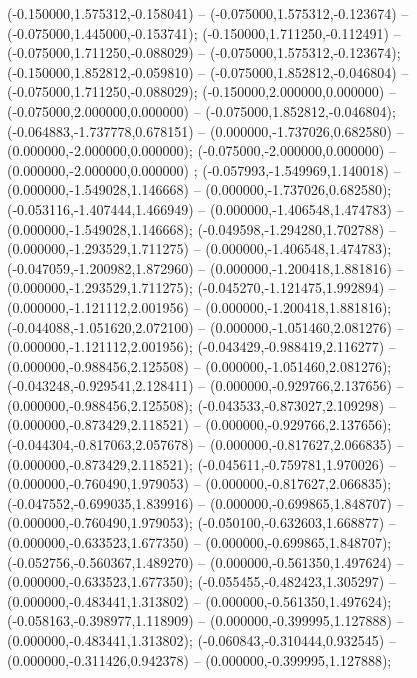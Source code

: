  (-0.150000,1.575312,-0.158041) -- (-0.075000,1.575312,-0.123674) -- (-0.075000,1.445000,-0.153741);
 (-0.150000,1.711250,-0.112491) -- (-0.075000,1.711250,-0.088029) -- (-0.075000,1.575312,-0.123674);
 (-0.150000,1.852812,-0.059810) -- (-0.075000,1.852812,-0.046804) -- (-0.075000,1.711250,-0.088029);
 (-0.150000,2.000000,0.000000) -- (-0.075000,2.000000,0.000000) -- (-0.075000,1.852812,-0.046804);
 (-0.064883,-1.737778,0.678151) -- (0.000000,-1.737026,0.682580) -- (0.000000,-2.000000,0.000000);
 (-0.075000,-2.000000,0.000000) -- (0.000000,-2.000000,0.000000) ;
 (-0.057993,-1.549969,1.140018) -- (0.000000,-1.549028,1.146668) -- (0.000000,-1.737026,0.682580);
 (-0.053116,-1.407444,1.466949) -- (0.000000,-1.406548,1.474783) -- (0.000000,-1.549028,1.146668);
 (-0.049598,-1.294280,1.702788) -- (0.000000,-1.293529,1.711275) -- (0.000000,-1.406548,1.474783);
 (-0.047059,-1.200982,1.872960) -- (0.000000,-1.200418,1.881816) -- (0.000000,-1.293529,1.711275);
 (-0.045270,-1.121475,1.992894) -- (0.000000,-1.121112,2.001956) -- (0.000000,-1.200418,1.881816);
 (-0.044088,-1.051620,2.072100) -- (0.000000,-1.051460,2.081276) -- (0.000000,-1.121112,2.001956);
 (-0.043429,-0.988419,2.116277) -- (0.000000,-0.988456,2.125508) -- (0.000000,-1.051460,2.081276);
 (-0.043248,-0.929541,2.128411) -- (0.000000,-0.929766,2.137656) -- (0.000000,-0.988456,2.125508);
 (-0.043533,-0.873027,2.109298) -- (0.000000,-0.873429,2.118521) -- (0.000000,-0.929766,2.137656);
 (-0.044304,-0.817063,2.057678) -- (0.000000,-0.817627,2.066835) -- (0.000000,-0.873429,2.118521);
 (-0.045611,-0.759781,1.970026) -- (0.000000,-0.760490,1.979053) -- (0.000000,-0.817627,2.066835);
 (-0.047552,-0.699035,1.839916) -- (0.000000,-0.699865,1.848707) -- (0.000000,-0.760490,1.979053);
 (-0.050100,-0.632603,1.668877) -- (0.000000,-0.633523,1.677350) -- (0.000000,-0.699865,1.848707);
 (-0.052756,-0.560367,1.489270) -- (0.000000,-0.561350,1.497624) -- (0.000000,-0.633523,1.677350);
 (-0.055455,-0.482423,1.305297) -- (0.000000,-0.483441,1.313802) -- (0.000000,-0.561350,1.497624);
 (-0.058163,-0.398977,1.118909) -- (0.000000,-0.399995,1.127888) -- (0.000000,-0.483441,1.313802);
 (-0.060843,-0.310444,0.932545) -- (0.000000,-0.311426,0.942378) -- (0.000000,-0.399995,1.127888);
